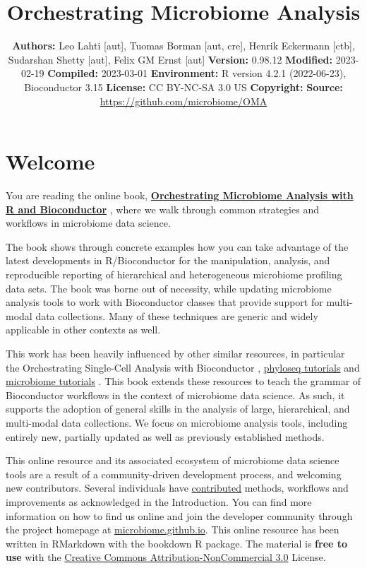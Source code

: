 \documentclass[
]{book}
\title{Orchestrating Microbiome Analysis}
\author{}
\date{\vspace{-2.5em}\textbf{Authors:} Leo Lahti {[}aut{]}, Tuomas Borman {[}aut, cre{]}, Henrik Eckermann {[}ctb{]}, Sudarshan Shetty {[}aut{]}, Felix GM Ernst {[}aut{]} \textbf{Version:} 0.98.12 \textbf{Modified:} 2023-02-19 \textbf{Compiled:} 2023-03-01 \textbf{Environment:} R version 4.2.1 (2022-06-23), Bioconductor 3.15 \textbf{License:} CC BY-NC-SA 3.0 US \textbf{Copyright:} \textbf{Source:} \url{https://github.com/microbiome/OMA}}
\begin{document}
\maketitle

{
\setcounter{tocdepth}{1}
\tableofcontents
}
\hypertarget{welcome}{%
\chapter*{Welcome}\label{welcome}}

You are reading the online book, \href{microbiome.github.io/OMA}{\textbf{Orchestrating Microbiome Analysis
with R and Bioconductor}} \citep{OMA}, where we
walk through common strategies and workflows in microbiome data
science.

The book shows through concrete examples how you can take advantage of
the latest developments in R/Bioconductor for the manipulation,
analysis, and reproducible reporting of hierarchical and heterogeneous
microbiome profiling data sets. The book was borne out of necessity,
while updating microbiome analysis tools to work with Bioconductor
classes that provide support for multi-modal data collections. Many of
these techniques are generic and widely applicable in other contexts
as well.

This work has been heavily influenced by other similar resources, in
particular the Orchestrating Single-Cell Analysis with Bioconductor
\citep{Amezquita2020}, \href{http://joey711.github.io/phyloseq/tutorials-index}{phyloseq
tutorials}
\citep{Callahan2016} and \href{https://microbiome.github.io/tutorials/}{microbiome
tutorials} \citep{Shetty2019}.
This book extends these resources to teach the grammar of Bioconductor
workflows in the context of microbiome data science. As such, it
supports the adoption of general skills in the analysis of large,
hierarchical, and multi-modal data collections. We focus on microbiome
analysis tools, including entirely new, partially updated as well as
previously established methods.

This online resource and its associated ecosystem of microbiome data
science tools are a result of a community-driven development process,
and welcoming new contributors. Several individuals have
\href{https://github.com/microbiome/OMA/graphs/contributors}{contributed}
methods, workflows and improvements as acknowledged in the
Introduction. You can find more information on how to find us online
and join the developer community through the project homepage at
\href{https://microbiome.github.io}{microbiome.github.io}. This online
resource has been written in RMarkdown with the bookdown R
package. The material is \textbf{free to use} with the \href{https://creativecommons.org/licenses/by-nc/3.0/us/}{Creative Commons
Attribution-NonCommercial
3.0} License.
\end{document}
